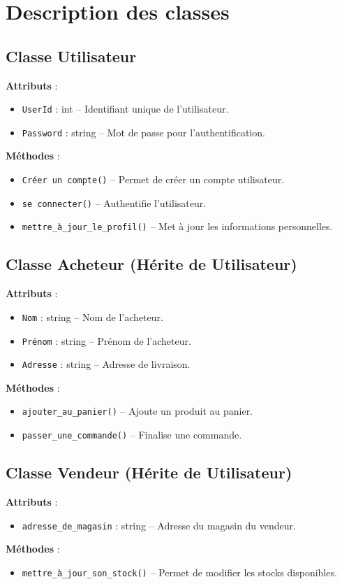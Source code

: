 \documentclass[a4paper,12pt]{article}
\begin{document}
\section{Description des classes}
\subsection{Classe Utilisateur}
\textbf{Attributs} :
\begin{itemize}
    \item \texttt{UserId} : int – Identifiant unique de l'utilisateur.
    \item \texttt{Password} : string – Mot de passe pour l'authentification.
\end{itemize}
\textbf{Méthodes} :
\begin{itemize}
    \item \texttt{Créer un compte()} – Permet de créer un compte utilisateur.
    \item \texttt{se connecter()} – Authentifie l'utilisateur.
    \item \texttt{mettre\_à\_jour\_le\_profil()} – Met à jour les informations personnelles.
\end{itemize}

\subsection{Classe Acheteur (Hérite de Utilisateur)}
\textbf{Attributs} :
\begin{itemize}
    \item \texttt{Nom} : string – Nom de l'acheteur.
    \item \texttt{Prénom} : string – Prénom de l'acheteur.
    \item \texttt{Adresse} : string – Adresse de livraison.
\end{itemize}
\textbf{Méthodes} :
\begin{itemize}
    \item \texttt{ajouter\_au\_panier()} – Ajoute un produit au panier.
    \item \texttt{passer\_une\_commande()} – Finalise une commande.
\end{itemize}

\subsection{Classe Vendeur (Hérite de Utilisateur)}
\textbf{Attributs} :
\begin{itemize}
    \item \texttt{adresse\_de\_magasin} : string – Adresse du magasin du vendeur.
\end{itemize}
\textbf{Méthodes} :
\begin{itemize}
    \item \texttt{mettre\_à\_jour\_son\_stock()} – Permet de modifier les stocks disponibles.
\end{itemize}
\end{document}
